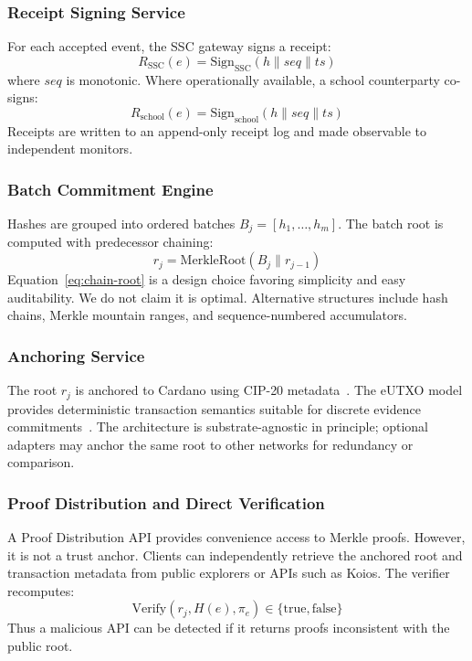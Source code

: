 \documentclass[journal]{IEEEtran}
\begin{document}
\subsubsection{Receipt Signing Service}
For each accepted event, the SSC gateway signs a receipt:
\begin{equation}
R_{\mathrm{SSC}}(e) = \mathrm{Sign}_{\mathrm{SSC}}(h \| \mathit{seq} \| \mathit{ts})
\end{equation}
where $\mathit{seq}$ is monotonic. Where operationally available, a school counterparty co-signs:
\begin{equation}
R_{\mathrm{school}}(e) = \mathrm{Sign}_{\mathrm{school}}(h \| \mathit{seq} \| \mathit{ts})
\end{equation}
Receipts are written to an append-only receipt log and made observable to independent monitors.

\subsubsection{Batch Commitment Engine}
Hashes are grouped into ordered batches $B_j = [h_1, \ldots, h_m]$. The batch root is computed with predecessor chaining:
\begin{equation}
r_j = \mathrm{MerkleRoot}(B_j \| r_{j-1})
\label{eq:chain-root}
\end{equation}
Equation~\ref{eq:chain-root} is a design choice favoring simplicity and easy auditability. We do not claim it is optimal. Alternative structures include hash chains, Merkle mountain ranges, and sequence-numbered accumulators.

\subsubsection{Anchoring Service}
The root $r_j$ is anchored to Cardano using CIP-20 metadata~\cite{cip20}. The eUTXO model provides deterministic transaction semantics suitable for discrete evidence commitments~\cite{pomogalova2022utxo, brunjes2020utxo}. The architecture is substrate-agnostic in principle; optional adapters may anchor the same root to other networks for redundancy or comparison.

\subsubsection{Proof Distribution and Direct Verification}
A Proof Distribution API provides convenience access to Merkle proofs. However, it is not a trust anchor. Clients can independently retrieve the anchored root and transaction metadata from public explorers or APIs such as Koios. The verifier recomputes:
\begin{equation}
\mathrm{Verify}(r_j, H(e), \pi_e) \in \{\mathrm{true}, \mathrm{false}\}
\end{equation}
Thus a malicious API can be detected if it returns proofs inconsistent with the public root.
\end{document}
